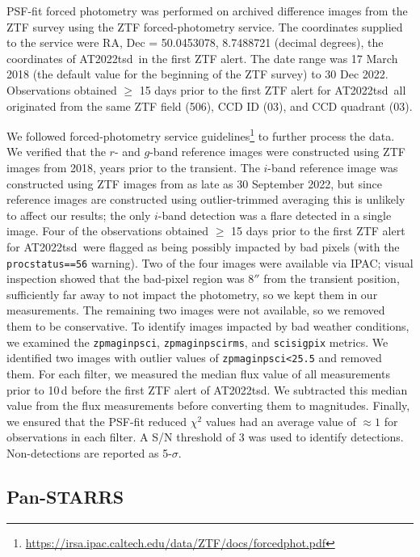 \documentclass{nature_plusfigure}
\newcommand{\at}{AT2022tsd}
\begin{document}
\begin{methods}
PSF-fit forced photometry was performed on archived difference images from the ZTF survey using the ZTF forced-photometry service\cite{Masci2019}. The coordinates supplied to the service were RA, Dec = 50.0453078, 8.7488721 (decimal degrees), the coordinates of \at\ in the first ZTF alert. The date range was 17 March 2018 (the default value for the beginning of the ZTF survey) to 30 Dec 2022.
Observations obtained $\geq$ 15 days prior to the first ZTF alert for \at\ all originated from the same ZTF field (506), CCD ID (03), and CCD quadrant (03). 

We followed forced-photometry service guidelines\footnote{\url{https://irsa.ipac.caltech.edu/data/ZTF/docs/forcedphot.pdf}} to further process the data.
We verified that the $r$- and $g$-band reference images were constructed using ZTF images from 2018, years prior to the transient. The $i$-band reference image was constructed using ZTF images from as late as 30 September 2022, but since reference images are constructed using outlier-trimmed averaging\cite{Masci2019} this is unlikely to affect our results; the only $i$-band detection was a flare detected in a single image. 
Four of the observations obtained $\geq$ 15 days prior to the first ZTF alert for \at\ were flagged as being possibly impacted by bad pixels (with the \texttt{procstatus==56} warning).
Two of the four images were available via IPAC; visual inspection showed that the bad-pixel region was 8$''$ from the transient position, sufficiently far away to not impact the photometry, so we kept them in our measurements.
The remaining two images were not available, so we removed them to be conservative.
To identify images impacted by bad weather conditions, we examined the \texttt{zpmaginpsci}, \texttt{zpmaginpscirms}, and \texttt{scisigpix} metrics. We identified two images with outlier values of \texttt{zpmaginpsci<25.5} and removed them.
For each filter, we measured the median flux value of all measurements prior to 10\,d before the first ZTF alert of \at. We subtracted this median value from the flux measurements before converting them to magnitudes.
Finally, we ensured that the PSF-fit reduced $\chi^2$ values had an average value of $\approx1$ for observations in each filter.
A S/N threshold of 3 was used to identify detections. Non-detections are reported as 5-$\sigma$.

\subsection{Pan-STARRS}
\label{sec:panstarrs}


\end{methods}
\end{document}

